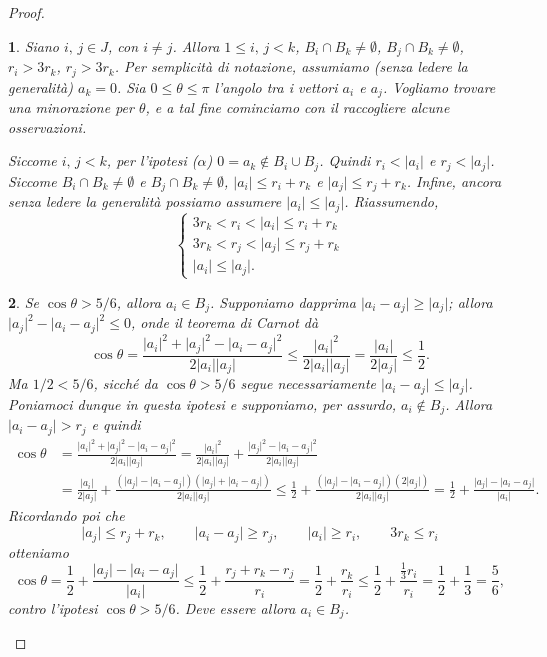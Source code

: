 \documentclass[a4paper,10pt,openright,oneside]{book}
\theoremstyle{theoremstyle}
\theoremstyle{theoremstylewoheader}
\theoremstyle{theoremstyle}
\theoremstyle{proofsecstyle}
\newtheorem{proofsec}{}
\theoremstyle{nonumberplain}
\newtheorem{proof}{Dim.}
\newcommand{\abs}[1]{\ensuremath{\lvert #1 \rvert}}
\begin{document}
\begin{proof}
\begin{proofsec}
Siano $i,\, j \in J$, con $i \ne j$. Allora $1 \le i,\,j < k$, $B_i \cap B_k \ne \emptyset$, $B_j \cap B_k \ne \emptyset$, $r_i > 3r_k$, $r_j > 3r_k$. Per semplicità di notazione, assumiamo (senza ledere la generalità) $a_k = 0$. Sia $0 \le \theta \le \pi$ l'angolo tra i vettori $a_i$ e $a_j$. Vogliamo trovare una minorazione per $\theta$, e a tal fine cominciamo con il raccogliere alcune osservazioni. 

Siccome $i,\, j < k$, per l'ipotesi ($\alpha$) $0 = a_k \notin B_i \cup B_j$. Quindi $r_i < \abs{a_i}$ e $r_j < \abs{a_j}$. Siccome $B_i \cap B_k \ne \emptyset$ e $B_j \cap B_k \ne \emptyset$, $\abs{a_i} \le r_i + r_k$ e $\abs{a_j} \le r_j + r_k$. Infine, ancora senza ledere la generalità possiamo assumere $\abs{a_i} \le \abs{a_j}$. Riassumendo,
\[
\left\{\begin{array}{l}
3r_k < r_i < \abs{a_i} \le r_i + r_k\\
3r_k < r_j < \abs{a_j} \le r_j + r_k\\
\abs{a_i} \le \abs{a_j}.
\end{array}\right.
\]
\end{proofsec}

\begin{proofsec}
\emph{Se $\cos \theta > 5/6$, allora $a_i \in B_j$.}\hspace{.5em} Supponiamo dapprima $\abs{a_i - a_j} \ge \abs{a_j}$; allora $\abs{a_j}^2 - \abs{a_i - a_j}^2 \le 0$, onde il teorema di Carnot dà
\[
\cos\theta = \frac{\abs{a_i}^2 + \abs{a_j}^2 - \abs{a_i - a_j}^2}{2\abs{a_i}\abs{a_j}} \le \frac{\abs{a_i}^2}{2\abs{a_i}\abs{a_j}} = \frac{\abs{a_i}}{2\abs{a_j}} \le \frac{1}{2}.
\]
Ma $1/2 < 5/6$, sicché da $\cos\theta > 5/6$ segue necessariamente $\abs{a_i - a_j} \le \abs{a_j}$. Poniamoci dunque in questa ipotesi e supponiamo, per assurdo, $a_i \notin B_j$. Allora $\abs{a_i - a_j} > r_j$ e quindi
\begin{align*}
\cos\theta &= \frac{\abs{a_i}^2 + \abs{a_j}^2 - \abs{a_i - a_j}^2}{2\abs{a_i}\abs{a_j}} = \frac{\abs{a_i}^2}{2\abs{a_i}\abs{a_j}} + \frac{\abs{a_j}^2 - \abs{a_i - a_j}^2}{2\abs{a_i}\abs{a_j}}\\
&= \frac{\abs{a_i}}{2\abs{a_j}} + \frac{(\abs{a_j} - \abs{a_i - a_j})(\abs{a_j} + \abs{a_i - a_j})}{2\abs{a_i}\abs{a_j}} \le \frac{1}{2} + \frac{(\abs{a_j} - \abs{a_i - a_j})(2\abs{a_j})}{2\abs{a_i}\abs{a_j}} = \frac{1}{2} + \frac{\abs{a_j} - \abs{a_i - a_j}}{\abs{a_i}}.
\end{align*}
Ricordando poi che
\[
\abs{a_j} \le r_j + r_k,\qquad \abs{a_i - a_j} \ge r_j,\qquad \abs{a_i} \ge r_i,\qquad 3r_k \le r_i
\]
otteniamo
\[
\cos\theta = \frac{1}{2} + \frac{\abs{a_j} - \abs{a_i - a_j}}{\abs{a_i}} \le \frac{1}{2} + \frac{r_j + r_k - r_j}{r_i} = \frac{1}{2} + \frac{r_k}{r_i} \le \frac{1}{2} + \frac{\frac{1}{3}r_i}{r_i} = \frac{1}{2} + \frac{1}{3} = \frac{5}{6},
\]
contro l'ipotesi $\cos\theta > 5/6$. Deve essere allora $a_i \in B_j$.
\end{proofsec}


\end{proof}
\end{document}
